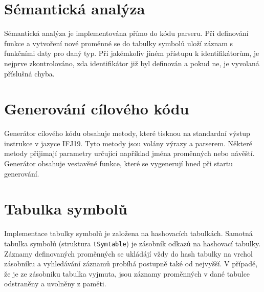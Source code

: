 \documentclass[12pt, a4paper]{article}
\begin{document}
\section{Sémantická analýza}
\justifying
Sémantická analýza je implementována přímo do kódu parseru. Při definování funkce a vytvoření nové proměnné se do tabulky symbolů uloží záznam s funkčními daty pro daný typ. Při jakémkoliv jiném přístupu k identifikátorům, je nejprve zkontrolováno, zda identifikátor již byl definován a pokud ne, je vyvolaná příslušná chyba.

\section{Generování cílového kódu}
\justifying
Generátor cílového kódu obsahuje metody, které tisknou na standardní výstup instrukce v jazyce IFJ19. Tyto metody jsou volány výrazy a parserem. Některé metody přijimají parametry určující například jména proměnných nebo návěští. Generátor obsahuje vestavěné funkce, které se vygenerují hned při startu generování.

\section{Tabulka symbolů}
\justifying
Implementace tabulky symbolů je založena na hashovacích tabulkách. Samotná tabulka symbolů (struktura \texttt{tSymtable}) je zásobník odkazů na hashovací tabulky. Záznamy definovaných proměnných se ukládájí vždy do hash tabulky na vrchol zásobníku a vyhledávání záznamů probíhá postupně také od nejvyšší. V případě, že je ze zásobniku tabulka vyjmuta, jsou záznamy proměnných v dané tabulce odstraněny a uvolněny z paměti.

\newpage
\end{document}
